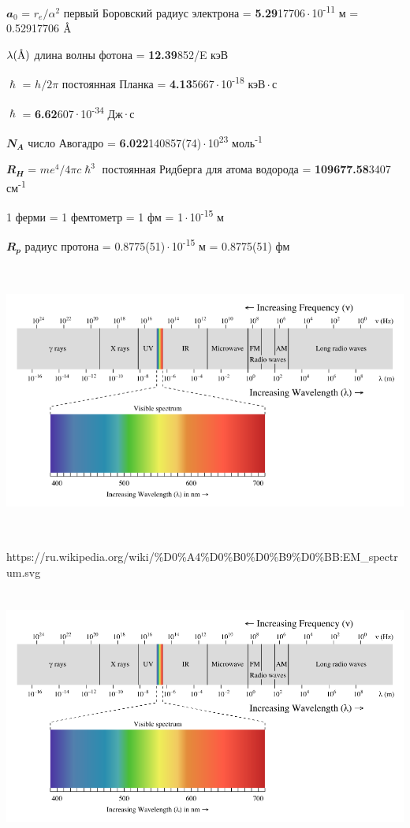 \documentclass[a4paper,14pt, openany, twoside, draft]{extbook} %
\newcommand{\AAA}{\textup{\AA}}
\begin{document}
$\mathbfit{a_0}$ = $r_e/\alpha^2$ первый Боровский радиус электрона  = \textbf{5.29}17706\,$\cdot$\,10\textsuperscript{-11} м = 0.52917706 $\AAA$

$\lambda(\AAA)$  длина волны фотона = \textbf{12.39}852/E кэВ

$\mathbfit{\hslash}$ = $h/2\pi$ постоянная Планка = \textbf{4.13}5667\,$\cdot$\,10\textsuperscript{-18} кэВ\,$\cdot$\,с

$\mathbfit{\hslash}$ = \textbf{6.62}607\,$\cdot$\,10\textsuperscript{-34} Дж\,$\cdot$\,с

$\mathbfit{N_A}$  число Авогадро = \textbf{6.022}140857(74)\,$\cdot$\,10\textsuperscript{23} моль\textsuperscript{-1}

$\mathbfit{R_H}$ = $me^4/4\pi c\hslash^3$ постоянная Ридберга для атома водорода = \textbf{109677.58}3407 см\textsuperscript{-1}

1 ферми = 1 фемтометр = 1 фм = 1\,$\cdot$\,10\textsuperscript{-15} м

$\mathbfit{R_p}$ радиус протона = 0.8775(51)\,$\cdot$\,10\textsuperscript{-15} м = 0.8775(51) фм

\clearpage{}
 \includegraphics[width=16.866cm,height=9.022cm]{EMRad-img001.png}

https://ru.wikipedia.org/wiki/\%D0\%A4\%D0\%B0\%D0\%B9\%D0\%BB:EM\_spectrum.svg

 \includegraphics[width=15.665cm,height=8.382cm]{EMRad-img002.png}
\end{document}
